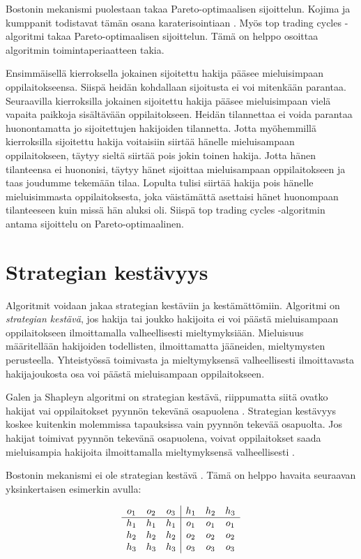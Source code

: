 \documentclass[gradu, twoside]{tktltiki}
\begin{document}
Bostonin mekanismi puolestaan takaa Pareto-optimaalisen sijoittelun.
Kojima ja kumppanit todistavat tämän osana karaterisointiaan
\cite{kojima10}. Myös top trading cycles -algoritmi takaa
Pareto-optimaalisen sijoittelun. Tämä on helppo osoittaa algoritmin
toimintaperiaatteen takia.

Ensimmäisellä kierroksella jokainen sijoitettu hakija pääsee
mieluisimpaan oppilaitokseensa. Siispä heidän kohdallaan sijoitusta ei
voi mitenkään parantaa. Seuraavilla kierroksilla jokainen sijoitettu
hakija pääsee mieluisimpaan vielä vapaita paikkoja sisältävään
oppilaitokseen. Heidän tilannettaa ei voida parantaa huonontamatta jo
sijoitettujen hakijoiden tilannetta. Jotta myöhemmillä kierroksilla
sijoitettu hakija voitaisiin siirtää hänelle mieluisampaan
oppilaitokseen, täytyy sieltä siirtää pois jokin toinen hakija. Jotta
hänen tilanteensa ei huononisi, täytyy hänet sijoittaa mieluisampaan
oppilaitokseen ja taas joudumme tekemään tilaa. Lopulta tulisi siirtää
hakija pois hänelle mieluisimmasta oppilaitoksesta, joka väistämättä
asettaisi hänet huonompaan tilanteeseen kuin missä hän aluksi oli.
Siispä top trading cycles -algoritmin antama sijoittelu on
Pareto-optimaalinen.

\section{Strategian kestävyys}

Algoritmit voidaan jakaa strategian kestäviin ja kestämättömiin.
Algoritmi on \emph{strategian kestävä}, jos hakija tai joukko
hakijoita ei voi päästä mieluisampaan oppilaitokseen ilmoittamalla
valheellisesti mieltymyksiään. Mieluisuus määritellään hakijoiden
todellisten, ilmoittamatta jääneiden, mieltymysten perusteella.
Yhteistyössä toimivasta ja mieltymyksensä valheellisesti ilmoittavasta
hakijajoukosta osa voi päästä mieluisampaan oppilaitokseen.

Galen ja Shapleyn algoritmi on strategian kestävä, riippumatta siitä
ovatko hakijat vai oppilaitokset pyynnön tekevänä osapuolena
\cite{dubins81}. Strategian kestävyys koskee kuitenkin molemmissa
tapauksissa vain pyynnön tekevää osapuolta. Jos hakijat toimivat
pyynnön tekevänä osapuolena, voivat oppilaitokset saada mieluisampia
hakijoita ilmoittamalla mieltymyksensä valheellisesti \cite{dubins81}.

Bostonin mekanismi ei ole strategian kestävä \cite{abdusön03}. Tämä on
helppo havaita seuraavan yksinkertaisen esimerkin avulla:

\[
  \begin{array}{c c c}
    o_1 & o_2 & o_3 \\
    \hline
    h_1 & h_1 & h_1 \\
    h_2 & h_2 & h_2 \\
    h_3 & h_3 & h_3
  \end{array}
  \begin{array}{|c c c}
    h_1 & h_2 & h_3 \\
    \hline
    o_1 & o_1 & o_1 \\
    o_2 & o_2 & o_2 \\
    o_3 & o_3 & o_3
  \end{array}
\]
\end{document}
